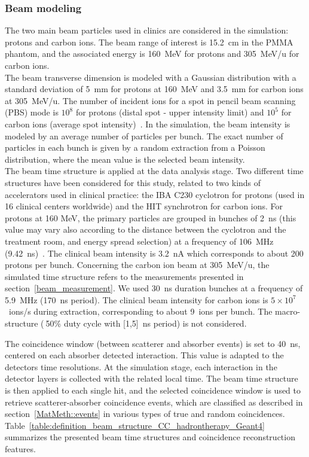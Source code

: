 \subsubsection{Beam modeling}\label{beam_modeling}
The two main beam particles used in clinics are considered in the simulation: protons and carbon ions. The beam range of interest is 15.2~cm in the PMMA phantom, and the associated energy is 160~MeV for protons and 305~MeV/u for carbon ions.\\ 
The beam transverse dimension is modeled with a Gaussian distribution with a standard deviation of 5~mm for protons at 160~MeV and 3.5~mm for carbon ions at 305~MeV/u. The number of incident ions for a spot in pencil beam scanning (PBS) mode is $10^8$ for protons (distal spot - upper intensity limit) and $10^5$ for carbon ions (average spot intensity)~\cite{Kramer:2000aa, Grevillot_2011,smeets_2012}. In the simulation, the beam intensity is modeled by an average number of particles per bunch. The exact number of particles in each bunch is given by a random extraction from a Poisson distribution, where the mean value is the selected beam intensity.\\
The beam time structure is applied at the data analysis stage. Two different time structures have been considered for this study, related to two kinds of accelerators used in clinical practice: the IBA C230 cyclotron for protons (used in 16 clinical centers worldwide) and the HIT synchrotron for carbon ions. For protons at 160 MeV, the primary particles are grouped in bunches of 2~ns (this value may vary also according to the distance between the cyclotron and the treatment room, and energy spread selection) at a frequency of 106~MHz (9.42~ns)~\cite{Roellinghoff_2014}. The clinical beam intensity is 3.2~nA which corresponds to about 200 protons per bunch. Concerning the carbon ion beam at 305~MeV/u, the simulated time structure refers to the measurements presented in section~\ref{beam_measurement}. We used 30~ns duration bunches at a frequency of 5.9~MHz (170~ns period). The clinical beam intensity for carbon ions is $5\times10^7$~ions/s during extraction, corresponding to about 9~ions per bunch. The macro-structure ($~$50\% duty cycle with [1,5]~ns period) is not considered. 

The coincidence window (between scatterer and absorber events) is set to 40~ns, centered on each absorber detected interaction. This value is adapted to the detectors time resolutions. At the simulation stage, each interaction in the detector layers is collected with the related local time. The beam time structure is then applied to each single hit, and the selected coincidence window is used to retrieve scatterer-absorber coincidence events, which are classified as described in section~\ref{MatMeth::events} in various types of true and random coincidences.\\ 
Table~\ref{table:definition_beam_structure_CC_hadrontherapy_Geant4} summarizes the presented beam time structures and coincidence reconstruction features.

